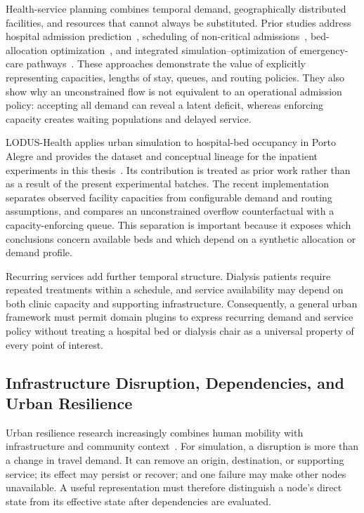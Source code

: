 \documentclass[pdflatex,sn-mathphys-num]{sn-jnl}%
\theoremstyle{thmstyleone}%
\theoremstyle{thmstyletwo}%
\theoremstyle{thmstylethree}%
\begin{document}
Health-service planning combines temporal demand, geographically distributed facilities, and resources that cannot always be substituted. Prior studies address hospital admission prediction~\citep{elbouri2021admission}, scheduling of non-critical admissions~\citep{bruballa2020scheduling}, bed-allocation optimization~\citep{karbouband2023bed}, and integrated simulation--optimization of emergency-care pathways~\citep{allihaibi2021pathway}. These approaches demonstrate the value of explicitly representing capacities, lengths of stay, queues, and routing policies. They also show why an unconstrained flow is not equivalent to an operational admission policy: accepting all demand can reveal a latent deficit, whereas enforcing capacity creates waiting populations and delayed service.

LODUS-Health applies urban simulation to hospital-bed occupancy in Porto Alegre and provides the dataset and conceptual lineage for the inpatient experiments in this thesis~\citep{souza2026lodushealth}. Its contribution is treated as prior work rather than as a result of the present experimental batches. The recent implementation separates observed facility capacities from configurable demand and routing assumptions, and compares an unconstrained overflow counterfactual with a capacity-enforcing queue. This separation is important because it exposes which conclusions concern available beds and which depend on a synthetic allocation or demand profile.

Recurring services add further temporal structure. Dialysis patients require repeated treatments within a schedule, and service availability may depend on both clinic capacity and supporting infrastructure. Consequently, a general urban framework must permit domain plugins to express recurring demand and service policy without treating a hospital bed or dialysis chair as a universal property of every point of interest.

\subsection{Infrastructure Disruption, Dependencies, and Urban Resilience}
\label{related:resilience}

Urban resilience research increasingly combines human mobility with infrastructure and community context~\citep{haraguchi2022mobilityDataReview,ye2023digitalTwinResiliance}. For simulation, a disruption is more than a change in travel demand. It can remove an origin, destination, or supporting service; its effect may persist or recover; and one failure may make other nodes unavailable. A useful representation must therefore distinguish a node's direct state from its effective state after dependencies are evaluated.
\end{document}
